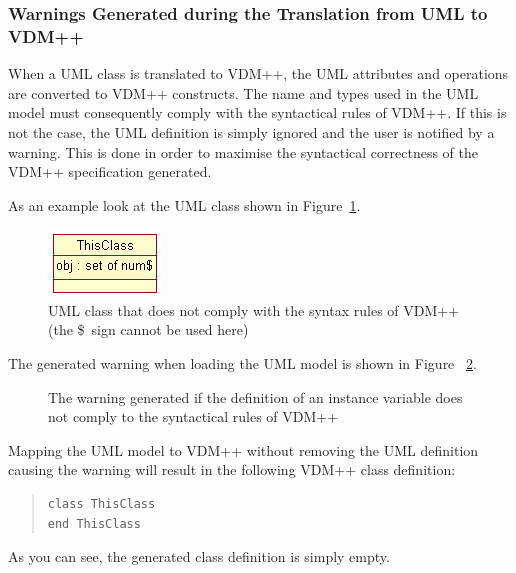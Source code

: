 \documentclass[\pformat,12pt]{article}
\newcommand{\vdmpp}{VDM++}
\begin{document}
\subsubsection*{Warnings Generated during the Translation from UML to \vdmpp{}}

When a UML class is translated to \vdmpp{}, the UML attributes and
operations are converted to \vdmpp{} constructs.  The name and types
used in the UML model must consequently comply with the syntactical
rules of \vdmpp{}. If this is not the case, the UML definition is
simply ignored and the user is notified by a warning.  This is done in
order to maximise the syntactical correctness of the \vdmpp{}
specification generated.

As an example look at the UML class shown in Figure~\ref{fig:noncompliance}.

\begin{figure}[htb]
\begin{center}
\mbox{}
\vspace{0.5cm}
\includegraphics{noncompliance}
\caption{UML class that does not comply with the syntax 
rules of \vdmpp{} (the \$\ sign cannot be used here)\label{fig:noncompliance}}
\end{center}
\end{figure}

The generated warning when loading the UML model is shown in Figure ~\ref{fig:warning}.
\begin{figure}[htb]
\begin{center}
\mbox{}
\vspace{0.5cm}
\caption{The warning generated if the definition of an instance
  variable does not comply to the syntactical rules of \vdmpp{}\label{fig:warning}}
\end{center}
\end{figure}
Mapping the UML model to \vdmpp{} without removing the UML definition
causing the warning will result in the following \vdmpp{} class
definition:

\begin{quote}
\begin{verbatim}
class ThisClass
end ThisClass
\end{verbatim}
\end{quote}

As you can see, the generated class definition is simply empty.
\end{document}
